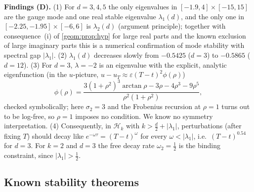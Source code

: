 \textbf{Findings (D).} (1) For $d=3,4,5$ the only eigenvalues in
$[-1.9,4]\times[-15,15]$ are the gauge mode and one real stable eigenvalue
$\lambda_1(d)$, and the only one in $[-2.25,-1.95]\times[-6,6]$ is
$\lambda_2(d)$ (argument principle); together with consequence~(i) of
\cref{geom:prop:hyp} for large real parts and the known exclusion of large imaginary parts
\cite{DonningerSchoerkhuberAichelburg2012} this is a numerical confirmation
of mode stability with spectral gap $|\lambda_1|$. (2) $\lambda_1(d)$
decreases slowly from $-0.5425$ ($d=3$) to $-0.5865$ ($d=12$). (3) For $d=3$,
$\lambda=-2$ is an eigenvalue with the explicit, analytic eigenfunction (in
the $u$-picture, $u-u_T\approx\varepsilon(T-t)^2\phi(\rho)$)
\[
  \phi(\rho)=\frac{3(1+\rho^2)^3\arctan\rho-3\rho-4\rho^3-9\rho^5}{\rho^2(1+\rho^2)},
\]
checked symbolically; here $\sigma_2=3$ and the Frobenius recursion at
$\rho=1$ turns out to be log-free, so $\rho=1$ imposes no condition. We know
no symmetry interpretation. (4) Consequently, in $\mathcal H_k$ with
$k>\frac d2+|\lambda_1|$, perturbations (after fixing $T$) should decay like
$e^{-\omega\tau}=(T-t)^{\omega}$ for every $\omega<|\lambda_1|$, i.e.\
$(T-t)^{0.54}$ for $d=3$. For $k=2$ and $d=3$ the free decay rate
$\omega_2=\frac12$ is the binding constraint, since $|\lambda_1|>\frac12$.

\subsection{Known stability theorems}
\label{geom:sec:wm-thm}

